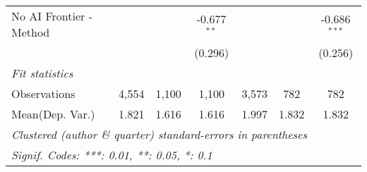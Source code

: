 \begin{tabular}{lcccccc}
   No AI Frontier - Method &               &             & -0.677$^{**}$ &               &         & -0.686$^{***}$\\   
                           &               &             & (0.296)       &               &         & (0.256)\\   
   \midrule
   \emph{Fit statistics}\\
   Observations            & 4,554         & 1,100       & 1,100         & 3,573         & 782     & 782\\  
Mean(Dep. Var.) & 1.821 & 1.616 & 1.616 & 1.997 & 1.832 & 1.832 \\
   \midrule \midrule
   \multicolumn{7}{l}{\emph{Clustered (author \& quarter) standard-errors in parentheses}}\\
   \multicolumn{7}{l}{\emph{Signif. Codes: ***: 0.01, **: 0.05, *: 0.1}}\\
\end{tabular}
\par\endgroup
